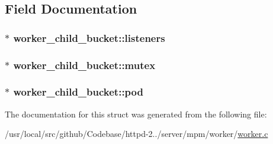 \subsection{Field Documentation}
\subsubsection[{\texorpdfstring{listeners}{listeners}}]{$\ast$ worker\+\_\+child\+\_\+bucket\+::listeners}\hypertarget{structworker__child__bucket_a31a34f0b285d487b6b62feb38c41c624}{}\label{structworker__child__bucket_a31a34f0b285d487b6b62feb38c41c624}
\subsubsection[{\texorpdfstring{mutex}{mutex}}]{$\ast$ worker\+\_\+child\+\_\+bucket\+::mutex}\hypertarget{structworker__child__bucket_ad67ff3f3f8bb84de20fa4371227fe151}{}\label{structworker__child__bucket_ad67ff3f3f8bb84de20fa4371227fe151}
\subsubsection[{\texorpdfstring{pod}{pod}}]{$\ast$ worker\+\_\+child\+\_\+bucket\+::pod}\hypertarget{structworker__child__bucket_a69d44e94f6c058194494b5af5a5f926c}{}\label{structworker__child__bucket_a69d44e94f6c058194494b5af5a5f926c}


The documentation for this struct was generated from the following file\+:\begin{DoxyCompactItemize}
\item 
/usr/local/src/github/\+Codebase/httpd-\/2../server/mpm/worker/\hyperlink{worker_8c}{worker.\+c}\end{DoxyCompactItemize}

